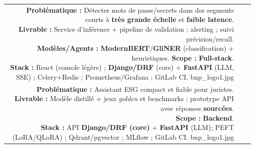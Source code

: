 \documentclass{modernsimplecv}
\newlength{\rightcolwidth}
\begin{document}
\begin{paracol}{2}
\begin{minipage}[t]{\rightcolwidth}
\begin{tabular}{r| p{} c}
\cvevent{2024}{PRODSEC: Détecteur de mot de passe}{Tech Lead}{BNPP ITG}{
\textbf{Problématique :} Détecter mots de passe/secrets dans des segments courts à \textbf{très grande échelle} et \textbf{faible latence}.\newline
\textbf{Livrable :} Service d’inférence + pipeline de validation ; alerting ; suivi précision/recall.\newline
\textbf{Modèles/Agents :} \textbf{ModernBERT}/\textbf{GliNER} (classification) + heuristiques.
\textbf{Scope :} \textbf{Full-stack}.\newline
\textbf{Stack :} React (console légère) ; \textbf{Django/DRF} (core) + \textbf{FastAPI} (LLM, SSE) ; Celery+Redis ; Prometheus/Grafana ; GitLab CI.
}
{bnp_logo1.jpg} \\



\cvevent{2023}{Réalisation d'un chatbot expert ESG}{Contributeur}{BNPP Securities \& Services}{
\textbf{Problématique :} Assistant ESG compact et fiable pour juristes.\newline
\textbf{Livrable :} Modèle distillé + jeux \textit{golden} et benchmarks ; prototype API avec réponses \textbf{sourcées}.\newline
\textbf{Scope :} \textbf{Backend}.\newline
\textbf{Stack :} API \textbf{Django/DRF (core)} + \textbf{FastAPI} (LLM); PEFT (LoRA/QLoRA) ; Qdrant/pgvector ; MLflow ; GitLab CI.
}
{bnp_logo1.jpg} \\



\end{tabular}
\end{minipage}

\end{paracol}












\newpage
\end{document}
